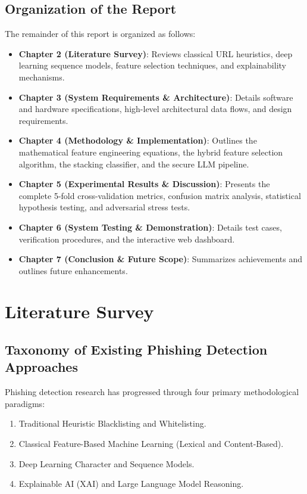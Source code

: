 \documentclass[12pt,a4paper,oneside]{report}
\begin{document}
\section{Organization of the Report}
The remainder of this report is organized as follows:
\begin{itemize}
    \item \textbf{Chapter 2 (Literature Survey)}: Reviews classical URL heuristics, deep learning sequence models, feature selection techniques, and explainability mechanisms.
    \item \textbf{Chapter 3 (System Requirements \& Architecture)}: Details software and hardware specifications, high-level architectural data flows, and design requirements.
    \item \textbf{Chapter 4 (Methodology \& Implementation)}: Outlines the mathematical feature engineering equations, the hybrid feature selection algorithm, the stacking classifier, and the secure LLM pipeline.
    \item \textbf{Chapter 5 (Experimental Results \& Discussion)}: Presents the complete 5-fold cross-validation metrics, confusion matrix analysis, statistical hypothesis testing, and adversarial stress tests.
    \item \textbf{Chapter 6 (System Testing \& Demonstration)}: Details test cases, verification procedures, and the interactive web dashboard.
    \item \textbf{Chapter 7 (Conclusion \& Future Scope)}: Summarizes achievements and outlines future enhancements.
\end{itemize}

\chapter{Literature Survey}

\section{Taxonomy of Existing Phishing Detection Approaches}
Phishing detection research has progressed through four primary methodological paradigms:
\begin{enumerate}
    \item Traditional Heuristic Blacklisting and Whitelisting.
    \item Classical Feature-Based Machine Learning (Lexical and Content-Based).
    \item Deep Learning Character and Sequence Models.
    \item Explainable AI (XAI) and Large Language Model Reasoning.
\end{enumerate}
\end{document}
